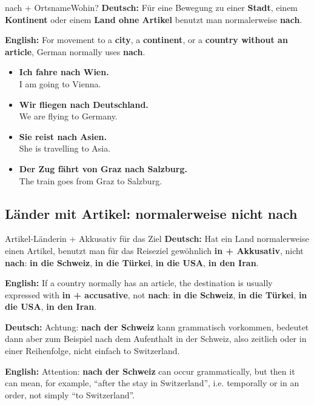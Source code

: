 \documentclass[a4paper,11pt]{article}
\newcommand{\GermanText}[1]{\textbf{Deutsch: }#1\par}
\newcommand{\EnglishText}[1]{{\small\color{SoftGray}\textbf{English: }#1\par}}
\newcommand{\ExampleItem}[2]{\item \textbf{#1}\\{\small\color{SoftGray}#2}}
\begin{document}
        \begin{grammarentry}{nach + Ortsname}{Wohin?}
            \GermanText{Für eine Bewegung zu einer \textbf{Stadt}, einem \textbf{Kontinent} oder einem \textbf{Land ohne Artikel} benutzt man normalerweise \textbf{nach}.}
            \EnglishText{For movement to a \textbf{city}, a \textbf{continent}, or a \textbf{country without an article}, German normally uses \textbf{nach}.}
        \end{grammarentry}

        \begin{exbox}
            \begin{itemize}
                \ExampleItem{Ich fahre nach Wien.}{I am going to Vienna.}
                \ExampleItem{Wir fliegen nach Deutschland.}{We are flying to Germany.}
                \ExampleItem{Sie reist nach Asien.}{She is travelling to Asia.}
                \ExampleItem{Der Zug fährt von Graz nach Salzburg.}{The train goes from Graz to Salzburg.}
            \end{itemize}
        \end{exbox}

        \subsection{Länder mit Artikel: normalerweise nicht nach}

        \begin{grammarentry}{Artikel-Länder}{in + Akkusativ für das Ziel}
            \GermanText{Hat ein Land normalerweise einen Artikel, benutzt man für das Reiseziel gewöhnlich \textbf{in + Akkusativ}, nicht \textbf{nach}: \textbf{in die Schweiz}, \textbf{in die Türkei}, \textbf{in die USA}, \textbf{in den Iran}.}
            \EnglishText{If a country normally has an article, the destination is usually expressed with \textbf{in + accusative}, not \textbf{nach}: \textbf{in die Schweiz}, \textbf{in die Türkei}, \textbf{in die USA}, \textbf{in den Iran}.}

            \GermanText{Achtung: \textbf{nach der Schweiz} kann grammatisch vorkommen, bedeutet dann aber zum Beispiel \glqq nach dem Aufenthalt in der Schweiz\grqq, also zeitlich oder in einer Reihenfolge, nicht einfach \glqq to Switzerland\grqq.}
            \EnglishText{Attention: \textbf{nach der Schweiz} can occur grammatically, but then it can mean, for example, ``after the stay in Switzerland'', i.e. temporally or in an order, not simply ``to Switzerland''.}
        \end{grammarentry}
\end{document}
